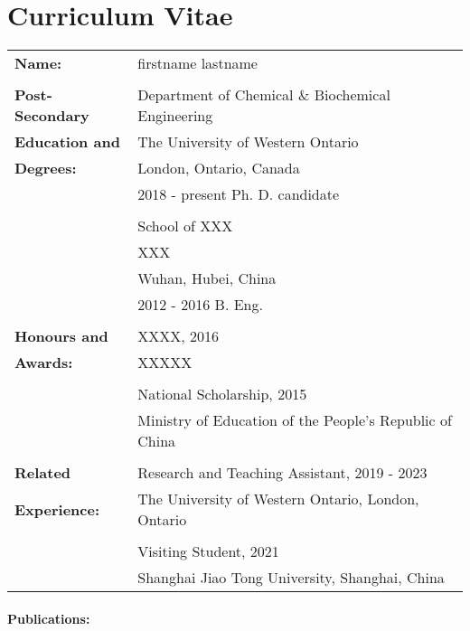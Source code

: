 \fancyhead{} %
\chapter*{Curriculum Vitae}
\begin{refsection}
\nocite{deng2017volumetric}

\begin{table}[!h]
\begin{tabular}{ll}
\textbf{Name:} & firstname lastname\\\\
\textbf{Post-Secondary} & Department of Chemical \& Biochemical Engineering\\
\textbf{Education and}& The University of Western Ontario\\
\textbf{Degrees:}& London, Ontario, Canada\\
& 2018 - present \quad Ph. D. candidate\\
\\
& School of XXX \\
& XXX \\
& Wuhan, Hubei, China\\
& 2012 - 2016 \quad B. Eng.\\
\\
\textbf{Honours and}& XXXX, 2016 \\
\textbf{Awards:} & XXXXX\\
& \\
& National Scholarship, 2015\\
& Ministry of Education of the People's Republic of China\\
& \\
\textbf{Related }& Research and Teaching Assistant, 2019 - 2023\\
\textbf{Experience:}& The University of Western Ontario, London, Ontario\\
& \\
& Visiting Student, 2021 \\
& Shanghai Jiao Tong University, Shanghai, China\\
\end{tabular}
\end{table}

\subsubsection*{Publications:}
\begin{singlespacing}
    \printbibliography[heading=none]
\end{singlespacing}
\end{refsection}